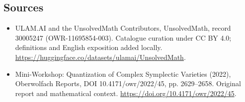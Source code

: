 \documentclass[11pt]{article}
\begin{document}
\subsection{Sources}
\begin{itemize}
\item[\hypertarget{source:30005247:1}{S1}] ULAM.AI and the UnsolvedMath Contributors, UnsolvedMath, record 30005247 (OWR-11695854-003). Catalogue curation under CC BY 4.0; definitions and English exposition added locally.
\url{https://huggingface.co/datasets/ulamai/UnsolvedMath}.
\item[\hypertarget{source:30005247:2}{S2}] Mini-Workshop: Quantization of Complex Symplectic Varieties (2022), Oberwolfach Reports, DOI 10.4171/owr/2022/45, pp. 2629--2658. Original report and mathematical context.
\url{https://doi.org/10.4171/owr/2022/45}.
\end{itemize}
\label{end:30005247}
\end{document}
